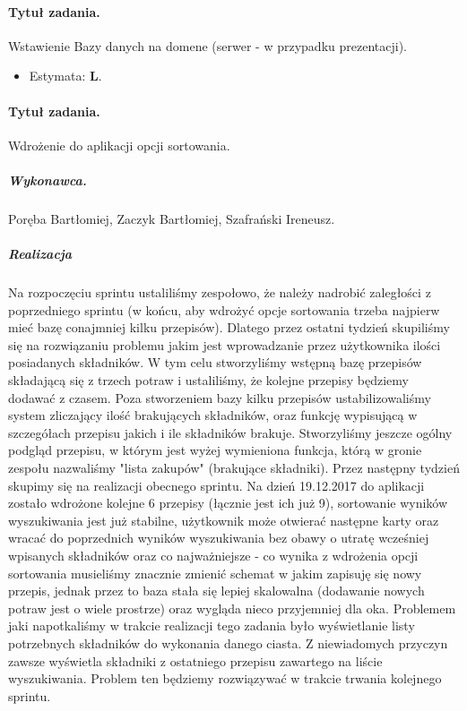 \documentclass[a4paper]{article}
\begin{document}
	\paragraph{Tytuł zadania.} Wstawienie Bazy danych na domene (serwer - w przypadku prezentacji).
	\begin{itemize}
		\item Estymata: \textbf{L}.
	\end{itemize}
	
	\paragraph{Tytuł zadania.} Wdrożenie do aplikacji opcji sortowania.
	\subparagraph{Wykonawca.} Poręba Bartłomiej, Zaczyk Bartłomiej, Szafrański Ireneusz.
	\subparagraph{Realizacja}
	Na rozpoczęciu sprintu ustaliliśmy zespołowo, że należy nadrobić zaległości z poprzedniego sprintu (w końcu, aby wdrożyć opcje sortowania trzeba najpierw mieć bazę conajmniej kilku przepisów). Dlatego przez ostatni tydzień skupiliśmy się na rozwiązaniu problemu jakim jest wprowadzanie przez użytkownika ilości posiadanych składników. W tym celu stworzyliśmy wstępną bazę przepisów składającą się z trzech potraw i ustaliliśmy, że kolejne przepisy będziemy dodawać z czasem. Poza stworzeniem bazy kilku przepisów ustabilizowaliśmy system zliczający ilość brakujących składników, oraz funkcję wypisującą w szczegółach przepisu jakich i ile składników brakuje. Stworzyliśmy jeszcze ogólny podgląd przepisu, w którym jest wyżej wymieniona funkcja, którą w gronie zespołu nazwaliśmy "lista zakupów" (brakujące składniki). Przez następny tydzień skupimy się na realizacji obecnego sprintu.
	Na dzień 19.12.2017 do aplikacji zostało wdrożone kolejne 6 przepisy (łącznie jest ich już 9), sortowanie wyników wyszukiwania jest już stabilne, użytkownik może otwierać następne karty oraz wracać do poprzednich wyników wyszukiwania bez obawy o utratę wcześniej wpisanych składników oraz co najważniejsze - co wynika z wdrożenia opcji sortowania musieliśmy znacznie zmienić schemat w jakim zapisuję się nowy przepis, jednak przez to baza stała się lepiej skalowalna (dodawanie nowych potraw jest o wiele prostrze) oraz wygląda nieco przyjemniej dla oka. Problemem jaki napotkaliśmy w trakcie realizacji tego zadania było wyświetlanie listy potrzebnych składników do wykonania danego ciasta. Z niewiadomych przyczyn zawsze wyświetla składniki z ostatniego przepisu zawartego na liście wyszukiwania. Problem ten będziemy rozwiązywać w trakcie trwania kolejnego sprintu.
	
\end{document}

